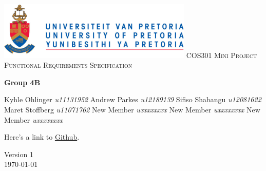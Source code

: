 \begin{titlepage}
\begin{center}
\includegraphics[width=350px]{University_of_Pretoria_Logo.png}\newline
\textsc{\LARGE COS301 Mini Project Functional Requirements Specification}\newline


\textbf{Group 4B} \\
\begin{flushright} \large
Kyhle Ohlinger \emph{u11131952} \newline
Andrew Parkes \emph{u12189139} \newline
Sifiso Shabangu \emph{u12081622} \newline
Maret Stoffberg \emph{u11071762} \newline
New Member \emph{uxxxxxxxx} \newline
New Member \emph{uxxxxxxxx} \newline
New Member \emph{uxxxxxxxx} \newline \newline \newline
\end{flushright}
Here's a link to \href{https://github.com/KyhleOhlinger/COS301-Group-4_B.git}{Github}.


\vfill

{\large Version 1}
\\
{\large \today}

\end{center}
\end{titlepage}
